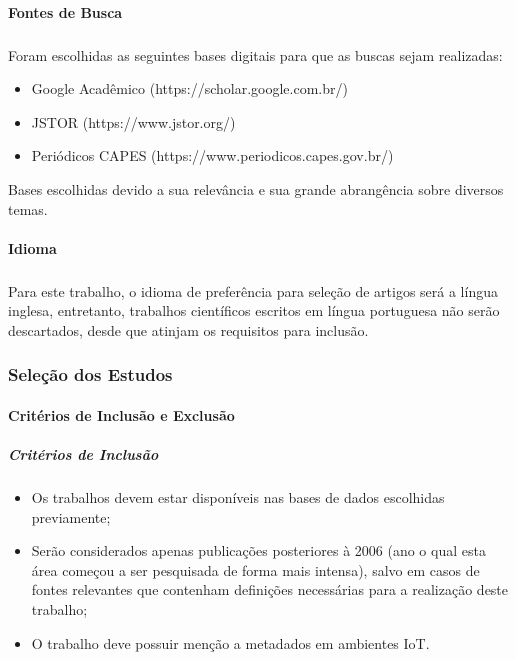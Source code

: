 \paragraph{Fontes de Busca}
\subparagraph{}
 Foram escolhidas as seguintes bases digitais para que as buscas sejam realizadas:
\begin{itemize}
  \item Google Acadêmico (https://scholar.google.com.br/)
  \item JSTOR (https://www.jstor.org/)
  \item Periódicos CAPES (https://www.periodicos.capes.gov.br/)
\end{itemize}
\quad Bases escolhidas devido a sua relevância e sua grande abrangência sobre diversos temas.

\paragraph{Idioma}
\subparagraph{}
\quad Para este trabalho, o idioma de preferência para seleção de artigos será a língua inglesa, entretanto, trabalhos científicos escritos em
língua portuguesa não serão descartados, desde que atinjam os requisitos para inclusão.

\subsubsection{Seleção dos Estudos}
\paragraph{Critérios de Inclusão e Exclusão}
\subparagraph{Critérios de Inclusão}
\begin{itemize}
  \item Os trabalhos devem estar disponíveis nas bases de dados escolhidas previamente;
  \item Serão considerados apenas publicações posteriores à 2006 (ano o qual esta área começou a ser pesquisada de forma mais intensa), salvo em casos de fontes relevantes que contenham definições necessárias para a realização deste trabalho;
  \item O trabalho deve possuir menção a metadados em ambientes \acrlong{IoT}.
\end{itemize}

